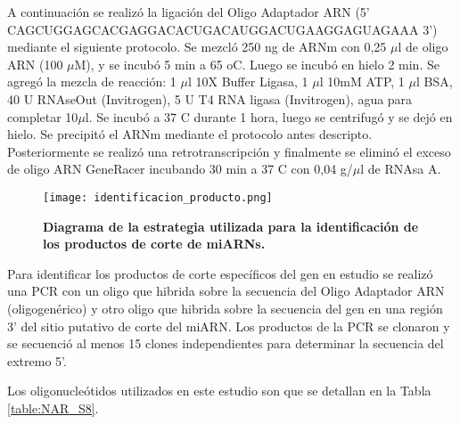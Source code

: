 A continuación se realizó la ligación del Oligo Adaptador ARN (5' CAGCUGGAGCACGAGGACACUGACAUGGACUGAAGGAGUAGAAA 3') mediante el siguiente protocolo.
Se mezcló 250 ng de ARNm con 0,25 $\mu$l de oligo ARN (100 $\mu$M), y se incubó 5 min a 65 oC. Luego se incubó en hielo 2 min.
Se agregó la mezcla de reacción: 1 $\mu$l 10X Buffer Ligasa, 1 $\mu$l 10mM ATP, 1 $\mu$l BSA, 40 U RNAseOut (Invitrogen), 5 U T4 RNA ligasa (Invitrogen), agua para completar 10$\mu$l.
Se incubó a 37 \degree  C durante 1 hora, luego se centrifugó y se dejó en hielo. 
Se precipitó el ARNm mediante el protocolo antes descripto.
Posteriormente se realizó una retrotranscripción y finalmente se eliminó el exceso de oligo ARN GeneRacer incubando 30 min a 37 \degree C con 0,04 g/$\mu$l de RNAsa A.

\begin{figure}[htbp!] 
    \centering    
    \texttt{[image: identificacion\_producto.png]}
    \caption[Diagrama de la estrategia utilizada para la identificación de los productos de corte de miARNs]{
        \textbf{Diagrama de la estrategia utilizada para la identificación de los productos de corte de miARNs.}
    }
    \label{fig:identificacion_producto}
\end{figure}

Para identificar los productos de corte específicos del gen en estudio se realizó una PCR con un oligo que hibrida sobre la secuencia del Oligo Adaptador ARN (oligogenérico) y otro oligo que hibrida sobre la secuencia del gen en una región 3' del sitio putativo de corte del miARN.
Los productos de la PCR se clonaron y se secuenció al menos 15 clones independientes para determinar la secuencia del extremo 5'.

Los oligonucleótidos utilizados en este estudio son que se detallan en la Tabla \ref{table:NAR_S8}.

